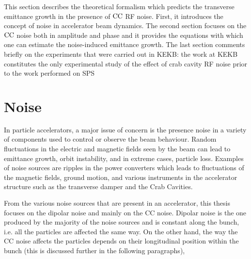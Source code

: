 This section describes the theoretical formalism which predicts the transverse emittance growth in the presence of ${\mathrm{CC}}$ RF noise. First, it introduces the concept of noise in accelerator beam dynamics. The second section focuses on the ${\mathrm{CC}}$ noise both in amplitude and phase and it provides the equations with which one can estimate the noise-induced emittance growth. The last section comments briefly on the experiments that were carried out in KEKB: the work at KEKB constitutes the only experimental study of the effect of crab cavity RF noise prior to the work performed on SPS 



\section{Noise}\label{sec:noise_definition}
In particle accelerators, a major issue of concern is the presence noise in a variety of components used to control or observe the beam behaviour. Random fluctuations in the electric and magnetic fields seen by the beam can lead to emittance growth, orbit instability, and in extreme cases, particle loss. Examples of noise sources are ripples in the power converters which leads to fluctuations of the magnetic fields, ground motion, and various instruments in the accelerator structure such as the transverse damper and the Crab Cavities. %


From the various noise sources that are present in an accelerator, this thesis focuses on the dipolar noise and mainly on the CC noise. Dipolar noise is the one produced by the majority of the noise sources and is constant along the bunch, i.e. all the particles are affected the same way. %
On the other hand, the way the CC noise affects the particles depends on their longitudinal position within the bunch (this is discussed further in the following paragraphs),

